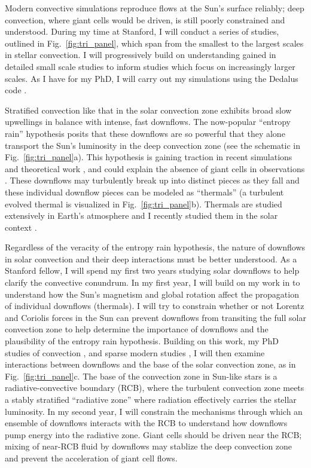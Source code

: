 \documentclass[onecolumn, 11pt, hmargin=1in, vmargin=1in]{aastex62}
\begin{document}
Modern convective simulations reproduce flows at the Sun's surface reliably; deep convection, where giant cells would be driven, is still poorly constrained and understood.
During my time at Stanford, I will conduct a series of studies, outlined in Fig.~\ref{fig:tri_panel}, which span from the smallest to the largest scales in stellar convection.
I will progressively build on understanding gained in detailed small scale studies to inform studies which focus on increasingly larger scales.
As I have for my PhD, I will carry out my simulations using the Dedalus code \citep{burns&all2019}.

Stratified convection like that in the solar convection zone exhibits broad slow upwellings in balance with intense, fast downflows.
The now-popular ``entropy rain'' hypothesis posits that these downflows are so powerful that they alone transport the Sun's luminosity in the deep convection zone (see the schematic in Fig.~\ref{fig:tri_panel}a).
This hypothesis is gaining traction in recent simulations \cite{kapyla&all2017} and theoretical work \citep{brandenburg2016}, and could explain the absence of giant cells in observations \citep{hanasoge&all2015}.
These downflows may turbulently break up into distinct pieces as they fall and these individual downflow pieces can be modeled as ``thermals'' (a turbulent evolved thermal is visualized in Fig.~\ref{fig:tri_panel}b).
Thermals are studied extensively in Earth's atmosphere \citep{lecoanet&jeevanjee2019} and I recently studied them in the solar context \citep{andersLB2019}.

Regardless of the veracity of the entropy rain hypothesis, the nature of downflows in solar convection and their deep interactions must be better understood.
As a Stanford fellow, I will spend my first two years studying solar downflows to help clarify the convective conundrum.
In my first year, I will build on my work in \citet{andersLB2019} to understand how the Sun's magnetism and global rotation affect the propagation of individual downflows (thermals).
I will try to constrain whether or not Lorentz and Coriolis forces in the Sun can prevent downflows from transiting the full solar convection zone to help determine the importance of downflows and the plausibility of the entropy rain hypothesis.
Building on this work, my PhD studies of convection \citep{anders&brown2017, anders&all2019}, and sparse modern studies \citep{brummell&all2002, wood&brummell2018}, I will then examine interactions between downflows and the base of the solar convection zone, as in Fig.~\ref{fig:tri_panel}c.
The base of the convection zone in Sun-like stars is a radiative-convective boundary (RCB), where the turbulent convection zone meets a stably stratified ``radiative zone'' where radiation effectively carries the stellar luminosity.
In my second year, I will constrain the mechanisms through which an ensemble of downflows interacts with the RCB to understand how downflows pump energy into the radiative zone.
Giant cells should be driven near the RCB; mixing of near-RCB fluid by downflows may stablize the deep convection zone and prevent the acceleration of giant cell flows.
\end{document}
